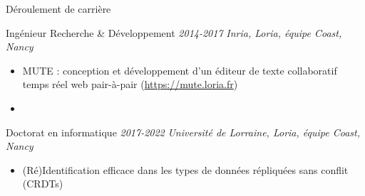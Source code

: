 \begin{frame}{Déroulement de carrière}


    \begin{block}{Ingénieur Recherche \& Développement \hspace*{\fill} \textnormal{\emph{2014-2017}}}
        \vspace{0mm}
        \emph{Inria, Loria, équipe Coast, Nancy}
        \begin{itemize}
            \item MUTE : conception et développement d'un éditeur de texte collaboratif temps réel web pair-à-pair (\url{https://mute.loria.fr})
            \item
        \end{itemize}
    \end{block}

    \begin{block}{Doctorat en informatique \hspace*{\fill} \textnormal{\emph{2017-2022}}}
        \vspace{0mm}
        \emph{Université de Lorraine, Loria, équipe Coast, Nancy}
        \begin{itemize}
            \item (Ré)Identification efficace dans les types de données répliquées sans conflit (CRDTs)
        \end{itemize}
    \end{block}
\end{frame}
